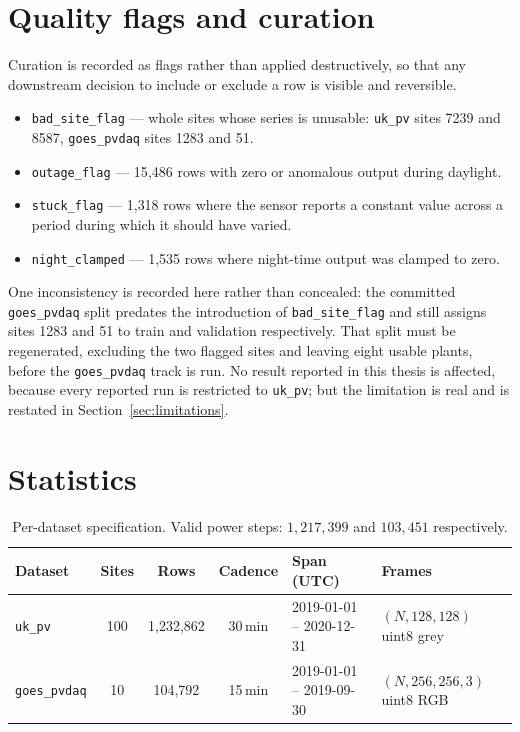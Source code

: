 \section{Quality flags and curation}
\label{sec:quality}

Curation is recorded as flags rather than applied destructively, so that any downstream
decision to include or exclude a row is visible and reversible.

\begin{itemize}
  \item \texttt{bad\_site\_flag} --- whole sites whose series is unusable: \texttt{uk\_pv}
    sites 7239 and 8587, \texttt{goes\_pvdaq} sites 1283 and 51.
  \item \texttt{outage\_flag} --- 15{,}486 rows with zero or anomalous output during
    daylight.
  \item \texttt{stuck\_flag} --- 1{,}318 rows where the sensor reports a constant value
    across a period during which it should have varied.
  \item \texttt{night\_clamped} --- 1{,}535 rows where night-time output was clamped to
    zero.
\end{itemize}

One inconsistency is recorded here rather than concealed: the committed
\texttt{goes\_pvdaq} split predates the introduction of \texttt{bad\_site\_flag} and still
assigns sites 1283 and 51 to train and validation respectively. That split must be
regenerated, excluding the two flagged sites and leaving eight usable plants, before the
\texttt{goes\_pvdaq} track is run. No result reported in this thesis is affected, because
every reported run is restricted to \texttt{uk\_pv}; but the limitation is real and is
restated in Section~\ref{sec:limitations}.

\section{Statistics}
\label{sec:data-stats}

\begin{table}[h!]
\centering
\small
\begin{tabular}{l c c c l l}
\hline
\textbf{Dataset} & \textbf{Sites} & \textbf{Rows} & \textbf{Cadence} & \textbf{Span (UTC)}
& \textbf{Frames} \\
\hline
\texttt{uk\_pv} & 100 & 1{,}232{,}862 & 30\,min & 2019-01-01 -- 2020-12-31 &
$(N,128,128)$ uint8 grey \\
\texttt{goes\_pvdaq} & 10 & 104{,}792 & 15\,min & 2019-01-01 -- 2019-09-30 &
$(N,256,256,3)$ uint8 RGB \\
\hline
\end{tabular}
\caption{Per-dataset specification. Valid power steps: $1{,}217{,}399$ and $103{,}451$
respectively.}
\label{tab:dataset-specs}
\end{table}

